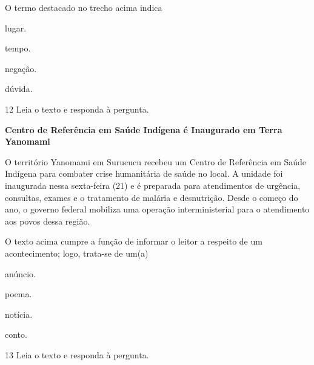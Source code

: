 O termo destacado no trecho acima indica

\begin{multicols}{2}
\begin{escolha}
  \item lugar.

  \item tempo.

  \item negação.

  \item dúvida.
\end{escolha}
\end{multicols}

\num{12} Leia o texto e responda à pergunta.

\begin{myquote}
\textbf{Centro de Referência em Saúde Indígena é Inaugurado em Terra
Yanomami}

O território Yanomami em Surucucu recebeu um Centro de Referência em
Saúde Indígena para combater crise humanitária de saúde no local. A
unidade foi inaugurada nessa sexta-feira (21) e é preparada para
atendimentos de urgência, consultas, exames e o tratamento de malária e
desnutrição. Desde o começo do ano, o governo federal mobiliza uma
operação interministerial para o atendimento aos povos dessa região.

\end{myquote}

O texto acima cumpre a função de informar o leitor a respeito de um
acontecimento; logo, trata-se de um(a)

\begin{multicols}{2}
\begin{escolha}
  \item anúncio.

  \item poema.

  \item notícia.

  \item conto.
\end{escolha}
\end{multicols}

\num{13} Leia o texto e responda à pergunta.

